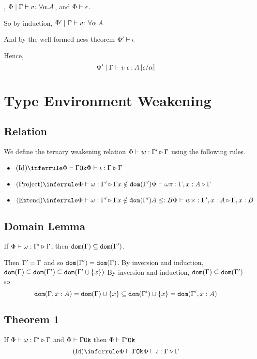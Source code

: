 {    \bi, $\Phi\mid\Gamma \vdash v \colon \forall \alpha. A$, and $\Phi\vdash \epsilon$.

    So by induction, $\Phi'\mid\Gamma \vdash v \colon \forall \alpha. A$

    And by the well-formed-ness-theorem $\Phi'\vdash \epsilon$

    Hence, \begin{equation}
        \Phi'\mid\Gamma \vdash v\;\epsilon \colon A\left[\epsilon / \alpha\right]
    \end{equation}

    \section{Type Environment Weakening}
    \subsection{Relation}
    We define the ternary weakening relation $\Phi\vdash w : \Gamma' \triangleright \Gamma$ using the following rules.


    \begin{itemize}
        \item $\ntreeruleI{Id}{\wellformedok{\P}{\G}}{\pewrel{\i}{\G}{\G}}$
        \item $\ntreeruleII{Project}{\pewrel{\w}{\G'}{\G}}{ x \notin \dom{\G'}}{\pewrel{\w \pi}{\G, x: A}{\G}}$
        \item $\ntreeruleIII{Extend}{\pewrel{\w}{\G'}{\G}}{ x \notin \dom{\G'}}{ A \subtype B}{\pewrel{w \x}{\G', x: A}{\G, x: B}}$
    \end{itemize}

    \subsection{Domain Lemma}
    If $\Phi\vdash \omega : \Gamma' \triangleright \Gamma$, then $\texttt{dom}(\Gamma)\subseteq \texttt{dom}(\Gamma')$.

    \proof
    Then $\Gamma' = \Gamma$ and so $\texttt{dom}(\Gamma') = \texttt{dom}(\Gamma)$.
    By inversion and induction, $\texttt{dom}(\Gamma)\subseteq\texttt{dom}(\Gamma')\subseteq\texttt{dom}(\Gamma'\cup\left\{x\right\})$
    By inversion and induction, $\texttt{dom}(\Gamma)\subseteq\texttt{dom}(\Gamma')$ so 
    $$\texttt{dom}(\Gamma, x: A) = \texttt{dom}(\Gamma)\cup\left\{x\right\} \subseteq\texttt{dom}(\Gamma')\cup\left\{x\right\} = \texttt{dom}(\Gamma',x:A)$$
    \subsection{Theorem 1}
    If $\Phi\vdash \omega : \Gamma' \triangleright \Gamma$ and $\Phi\vdash \Gamma \texttt{Ok}$ then $\Phi\vdash \Gamma' \texttt{Ok}$
    \proof
    $$\ntreeruleI{Id}{\wellformedok{\P}{\G}}{\pewrel{\i}{\G}{\G}}$$

}
